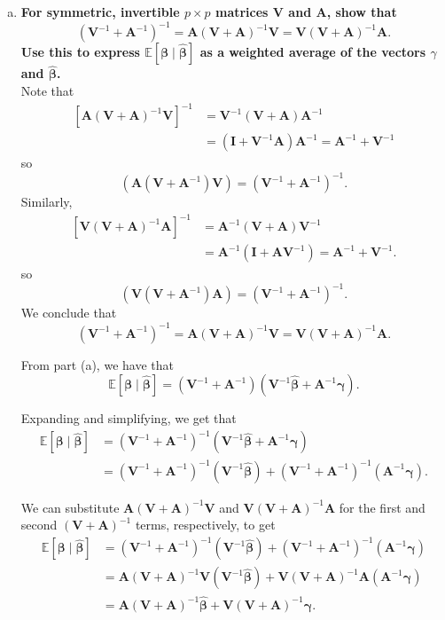 \begin{enumerate}[a)]
\item \textbf{For symmetric, invertible $p \times p$ matrices $\bm{V}$ and $\bm{A}$, show that}
\[
    (\bm{V}^{-1} + \bm{A}^{-1})^{-1} = \bm{A}(\bm{V} + \bm{A})^{-1}\bm{V} =  \bm{V}(\bm{V} + \bm{A})^{-1}\bm{A}. 
\]
\textbf{Use this to express $\mathbb{E}\left[\bm{\beta} \mid \hat{\bm{\beta}} \right]$ as a weighted average of the vectors $\gamma$ and $\hat{\bm{\beta}}$.} \\

Note that 
\begin{align*}
    \left[ \bm{A}(\bm{V} + \bm{A})^{-1}\bm{V} \right]^{-1} &= \bm{V}^{-1}(\bm{V} + \bm{A})\bm{A}^{-1} \\
    &= (\bm{I} + \bm{V}^{-1} \bm{A})\bm{A}^{-1} = \bm{A}^{-1} + \bm{V}^{-1} 
\end{align*}
so
\[
    (\bm{A}(\bm{V} + \bm{A}^{-1})\bm{V}) = (\bm{V}^{-1} + \bm{A}^{-1})^{-1}.
\]
Similarly,
\begin{align*}
    \left[ \bm{V}(\bm{V} + \bm{A})^{-1}\bm{A} \right]^{-1} &= \bm{A}^{-1}(\bm{V} + \bm{A})\bm{V}^{-1} \\
    &= \bm{A}^{-1}(\bm{I} + \bm{A}\bm{V}^{-1}) = \bm{A}^{-1} + \bm{V}^{-1}.
\end{align*}
so
\[
    (\bm{V}(\bm{V} + \bm{A}^{-1})\bm{A}) = (\bm{V}^{-1} + \bm{A}^{-1})^{-1}.
\]
We conclude that
\[
  \boxed{ (\bm{V}^{-1} + \bm{A}^{-1})^{-1} = \bm{A}(\bm{V} + \bm{A})^{-1}\bm{V} =  \bm{V}(\bm{V} + \bm{A})^{-1}\bm{A}}.  
\]

From part (a), we have that
\[
    \mathbb{E}\left[ \bm{\beta} \mid \hat{\bm{\beta}} \right] = (\bm{V}^{-1} + \bm{A}^{-1})(\bm{V}^{-1} \hat{\bm{\beta}} + \bm{A}^{-1} \bm{\gamma}).
\]

Expanding and simplifying, we get that
\begin{align*}
    \mathbb{E}\left[ \bm{\beta} \mid \hat{\bm{\beta}} \right] &= (\bm{V}^{-1} + \bm{A}^{-1})^{-1}(\bm{V}^{-1} \hat{\bm{\beta}} + \bm{A}^{-1} \bm{\gamma}) \\
    &= (\bm{V}^{-1} + \bm{A}^{-1})^{-1}(\bm{V}^{-1} \hat{\bm{\beta}}) + (\bm{V}^{-1} + \bm{A}^{-1})^{-1}(\bm{A}^{-1} \bm{\gamma}).
\end{align*}

We can substitute $\bm{A}(\bm{V} + \bm{A})^{-1}\bm{V}$ and $\bm{V}(\bm{V} + \bm{A})^{-1}\bm{A}$ for the first and second $(\bm{V} + \bm{A})^{-1}$ terms, respectively, to get
\begin{align*}
    \mathbb{E}\left[ \bm{\beta} \mid \hat{\bm{\beta}} \right] &= (\bm{V}^{-1} + \bm{A}^{-1})^{-1}(\bm{V}^{-1} \hat{\bm{\beta}}) + (\bm{V}^{-1} + \bm{A}^{-1})^{-1}(\bm{A}^{-1} \bm{\gamma}) \\
    &= \bm{A}(\bm{V} + \bm{A})^{-1}\bm{V}(\bm{V}^{-1} \hat{\bm{\beta}}) + \bm{V}(\bm{V} + \bm{A})^{-1}\bm{A}(\bm{A}^{-1} \bm{\gamma}) \\
    &= \bm{A}(\bm{V} + \bm{A})^{-1} \hat{\bm{\beta}} + \bm{V}(\bm{V} + \bm{A})^{-1} \bm{\gamma}.
\end{align*}


\end{enumerate}
